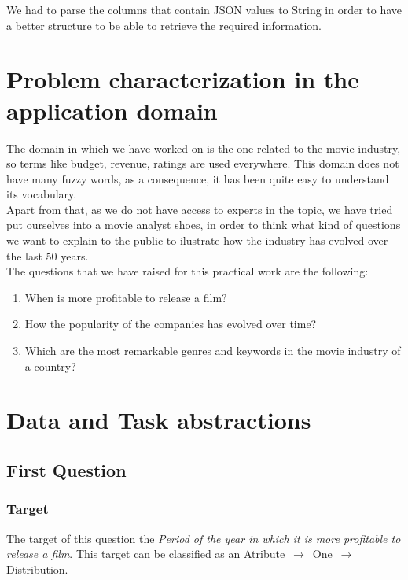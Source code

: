 We had to parse the columns that contain JSON values to String in order to have a better structure to be able to retrieve the required information.

\section{Problem characterization in the application domain}

The domain in which we have worked on is the one related to the movie industry, so terms like budget, revenue, ratings are used everywhere. This domain does not have many fuzzy words, as a consequence, it has been quite easy to understand its vocabulary.\\

Apart from that, as we do not have access to experts in the topic, we have tried put ourselves into a movie analyst shoes, in order to think what kind of questions we want to explain to the public to ilustrate how the industry has evolved over the last 50 years.\\

The questions that we have raised for this practical work are the following:

\begin{enumerate}
	\item When is more profitable to release a film?
	\item How the popularity of the companies has evolved over time?
	\item Which are the most remarkable genres and keywords in the movie industry of a country?
\end{enumerate}

\section{Data and Task abstractions}

\subsection{First Question}

\subsubsection{Target}
The target of this question the \textit{Period of the year in which it is more profitable to release a film}. This target can be classified as an Atribute $\,\to\,$ One $\,\to\,$ Distribution.

